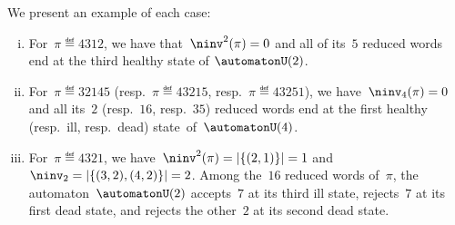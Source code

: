 \begin{example}\label{exm:sameStateAcceptedReducedExpressionsRefined}
We present an example of each case:
\begin{enumerate}[(i)]
	\item For~$\pi \eqdef 4312$, we have that~$\ninv^2(\pi)=0$ and all of its~$5$ reduced words end at the third healthy state of $\automatonU(2)$.
	\item For~$\pi \eqdef 32145$ (resp.~$\pi \eqdef 43215$, resp.~$\pi \eqdef 43251$), we have~$\ninv_4(\pi) = 0$ and all its~$2$ (resp.~$16$, resp.~$35$) reduced words end at the first healthy (resp.~ill, resp.~dead) state~of~$\automatonU(4)$.
	\item For~$\pi \eqdef 4321$, we have~$\ninv^2(\pi) = |\{(2,1)\}| = 1$ and $\ninv_2 = |\{(3,2),(4,2)\}| = 2$. Among the~$16$ reduced words of~$\pi$, the automaton~$\automatonU(2)$ accepts~$7$ at its third ill state, rejects~$7$ at its first dead state, and rejects the other~$2$ at its second dead state.
\end{enumerate}
\end{example}
